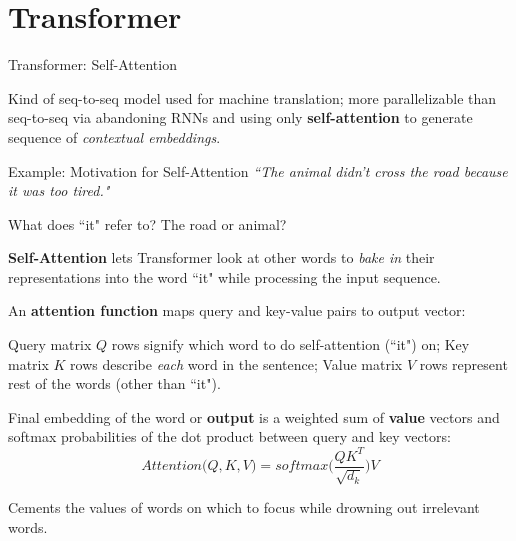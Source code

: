 
\section{Transformer}


\begin{frame}{Transformer: Self-Attention}
    
    \begin{itemizeSpaced}{2pt}
        \item Kind of seq-to-seq model used for machine translation; more parallelizable than seq-to-seq via abandoning RNNs and using only \textbf{self-attention} to generate sequence of \textit{contextual embeddings}.
        
    \end{itemizeSpaced}
    
    \begin{exampleBlock}{Example: Motivation for Self-Attention}
    {\large \emph{``The animal didn't cross the road because it was too tired."}}
    
    What does ``it" refer to? The road or animal?
    \end{exampleBlock}
    
    \begin{itemizeSpaced}{0pt}
        \item \textbf{Self-Attention} lets Transformer look at other words to \emph{bake in} their representations into the word ``it" while processing the input sequence.
        
        \item An \textbf{attention function} maps query and key-value pairs to output vector:
        
        \begin{itemizeSpaced}{0pt}
         
            \item Query matrix $Q$ rows signify which word to do self-attention (``it") on; Key matrix $K$ rows describe \emph{each} word in the sentence; Value matrix $V$ rows represent rest of the words (other than ``it"). 
            
            \item Final embedding of the word or \textbf{output} is a weighted sum of \textbf{value} vectors and softmax probabilities of the dot product between query and key vectors: 
            $$
            Attention \Big(Q, K, V \Big) = softmax \Bigg(\frac {QK^T} {\sqrt{d_k}} \Bigg) V
            $$
            
    \end{itemizeSpaced}
    
        \item Cements the values of words on which to focus while drowning out irrelevant words.
    \end{itemizeSpaced}
\end{frame}



